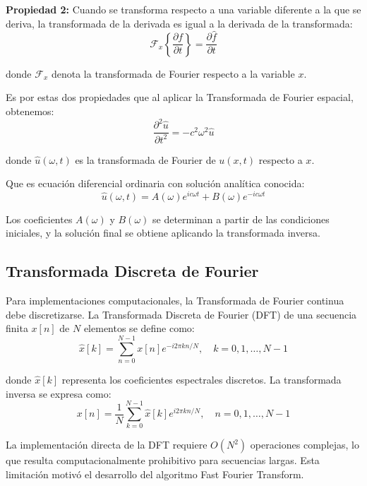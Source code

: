 \documentclass[a4paper]{article}
\begin{document}
\textbf{Propiedad 2:} Cuando se transforma respecto a una variable diferente a la que se deriva, la transformada de la derivada es igual a la derivada de la transformada:
\begin{equation}
    \mathcal{F}_x\left\{\frac{\partial f}{\partial t}\right\} = \frac{\partial \hat{f}}{\partial t}
\end{equation}

donde $\mathcal{F}_x$ denota la transformada de Fourier respecto a la variable $x$.

Es por estas dos propiedades que al aplicar la Transformada de Fourier espacial, obtenemos:
\begin{equation}
    \frac{\partial^2 \hat{u}}{\partial t^2} = -c^2 \omega^2 \hat{u}
\end{equation}

donde $\hat{u}(\omega, t)$ es la transformada de Fourier de $u(x,t)$ respecto a $x$.

Que es ecuación diferencial ordinaria con solución analítica conocida:
\begin{equation}
    \hat{u}(\omega, t) = A(\omega) e^{ic\omega t} + B(\omega) e^{-ic\omega t}
\end{equation}

Los coeficientes $A(\omega)$ y $B(\omega)$ se determinan a partir de las condiciones iniciales, y la solución final se obtiene
aplicando la transformada inversa.

\subsection{Transformada Discreta de Fourier}

Para implementaciones computacionales, la Transformada de Fourier continua debe discretizarse. La Transformada Discreta de Fourier (DFT) de una secuencia finita $x[n]$ de $N$ elementos se define como:
\begin{equation}
    \hat{x}[k] = \sum_{n=0}^{N-1} x[n] e^{-i2\pi kn/N}, \quad k = 0, 1, \ldots, N-1
\end{equation}

donde $\hat{x}[k]$ representa los coeficientes espectrales discretos. La transformada inversa se expresa como:
\begin{equation}
    x[n] = \frac{1}{N} \sum_{k=0}^{N-1} \hat{x}[k] e^{i2\pi kn/N}, \quad n = 0, 1, \ldots, N-1
\end{equation}

La implementación directa de la DFT requiere $O(N^2)$ operaciones complejas, lo que resulta computacionalmente prohibitivo para
secuencias largas. Esta limitación motivó el desarrollo del algoritmo Fast Fourier Transform.
\end{document}

